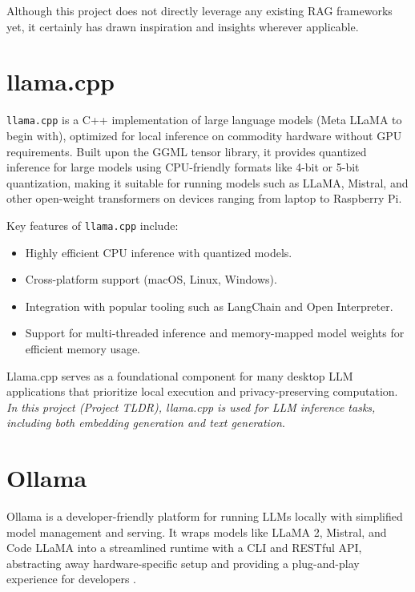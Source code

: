 Although this project does not directly leverage any existing RAG frameworks yet, it certainly has drawn inspiration and insights wherever applicable.

\section{llama.cpp}
\label{sec:llama_cpp}

\texttt{llama.cpp}\cite{gerganov2020llamacpp} is a C++ implementation of large language models (Meta LLaMA to begin with), optimized for local inference on commodity hardware without GPU requirements. Built upon the GGML tensor library, it provides quantized inference for large models using CPU-friendly formats like 4-bit or 5-bit quantization, making it suitable for running models such as LLaMA, Mistral, and other open-weight transformers on devices ranging from laptop to Raspberry Pi.

Key features of \texttt{llama.cpp} include:
\begin{itemize}
    \item Highly efficient CPU inference with quantized models.
    \item Cross-platform support (macOS, Linux, Windows).
    \item Integration with popular tooling such as LangChain and Open Interpreter.
    \item Support for multi-threaded inference and memory-mapped model weights for efficient memory usage.
\end{itemize}

Llama.cpp serves as a foundational component for many desktop LLM applications that prioritize local execution and privacy-preserving computation. \textit{In this project (Project TLDR), llama.cpp is used for LLM inference tasks, including both embedding generation and text generation}.

\section{Ollama}
\label{sec:ollama}

Ollama is a developer-friendly platform for running LLMs locally with simplified model management and serving. It wraps models like LLaMA 2, Mistral, and Code LLaMA into a streamlined runtime with a CLI and RESTful API, abstracting away hardware-specific setup and providing a plug-and-play experience for developers \cite{ollama}.

